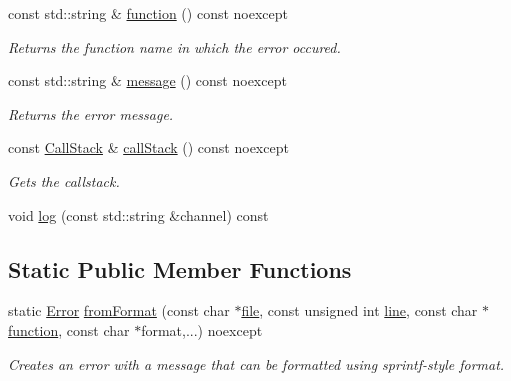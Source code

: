 \begin{DoxyCompactItemize}
const std\+::string \& \hyperlink{group___utility_module_gaa69c98222c56544a9094154a8eab4db9}{function} () const noexcept
\begin{DoxyCompactList}\small\item\em Returns the function name in which the error occured. \end{DoxyCompactList}\item 
const std\+::string \& \hyperlink{group___utility_module_ga7269ba8049ed86338733955565242539}{message} () const noexcept
\begin{DoxyCompactList}\small\item\em Returns the error message. \end{DoxyCompactList}\item 
const \hyperlink{group___utility_module_gabdf2d70ae3aab3c57142eddec69a725c}{Call\+Stack} \& \hyperlink{classdg_1_1deepcore_1_1_error_af326513a1dad0dde7d595c2b9f9d9d1e}{call\+Stack} () const noexcept
\begin{DoxyCompactList}\small\item\em Gets the callstack. \end{DoxyCompactList}\item 
void \hyperlink{classdg_1_1deepcore_1_1_error_a2b4a03a6ce3cc8b5ab2fdc719e270e61}{log} (const std\+::string \&channel) const 
\end{DoxyCompactItemize}
\subsection*{Static Public Member Functions}
\begin{DoxyCompactItemize}
\item 
static \hyperlink{classdg_1_1deepcore_1_1_error}{Error} \hyperlink{group___utility_module_ga00500e337578c7170d2608cb93af4f51}{from\+Format} (const char $\ast$\hyperlink{group___utility_module_ga0b75e32780cb8534179ff3c060739496}{file}, const unsigned int \hyperlink{group___utility_module_ga13437b5caffe754b7a32fc3c514907e5}{line}, const char $\ast$\hyperlink{group___utility_module_gaa69c98222c56544a9094154a8eab4db9}{function}, const char $\ast$format,...) noexcept
\begin{DoxyCompactList}\small\item\em Creates an error with a message that can be formatted using sprintf-\/style format. \end{DoxyCompactList}\end{DoxyCompactItemize}
